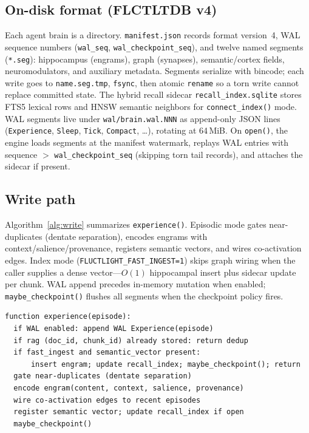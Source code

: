 \documentclass[11pt]{article}
\begin{document}
\subsection{On-disk format (FLCTLTDB v4)}
Each agent brain is a directory. \texttt{manifest.json} records format version~4,
WAL sequence numbers (\texttt{wal\_seq}, \texttt{wal\_checkpoint\_seq}), and twelve
named segments (\texttt{*.seg}): hippocampus (engrams), graph (synapses),
semantic/cortex fields, neuromodulators, and auxiliary metadata. Segments serialize
with bincode; each write goes to \texttt{name.seg.tmp}, \texttt{fsync}, then atomic
\texttt{rename} so a torn write cannot replace committed state. The hybrid recall
sidecar \texttt{recall\_index.sqlite} stores FTS5 lexical rows and HNSW semantic
neighbors for \texttt{connect\_index()} mode. WAL segments live under
\texttt{wal/brain.wal.NNN} as append-only JSON lines (\texttt{Experience},
\texttt{Sleep}, \texttt{Tick}, \texttt{Compact}, \ldots), rotating at 64\,MiB.
On \texttt{open()}, the engine loads segments at the manifest watermark, replays WAL
entries with sequence $>$ \texttt{wal\_checkpoint\_seq} (skipping torn tail records),
and attaches the sidecar if present.

\subsection{Write path}
Algorithm~\ref{alg:write} summarizes \texttt{experience()}. Episodic mode gates
near-duplicates (dentate separation), encodes engrams with context/salience/provenance,
registers semantic vectors, and wires co-activation edges. Index mode
(\texttt{FLUCTLIGHT\_FAST\_INGEST=1}) skips graph wiring when the caller supplies a
dense vector---$O(1)$ hippocampal insert plus sidecar update per chunk. WAL append
precedes in-memory mutation when enabled; \texttt{maybe\_checkpoint()} flushes all
segments when the checkpoint policy fires.

\begin{lstlisting}[caption={Write path (\texttt{experience}).},label={alg:write}]
function experience(episode):
  if WAL enabled: append WAL Experience(episode)
  if rag (doc_id, chunk_id) already stored: return dedup
  if fast_ingest and semantic_vector present:
      insert engram; update recall_index; maybe_checkpoint(); return
  gate near-duplicates (dentate separation)
  encode engram(content, context, salience, provenance)
  wire co-activation edges to recent episodes
  register semantic vector; update recall_index if open
  maybe_checkpoint()
\end{lstlisting}
\end{document}

